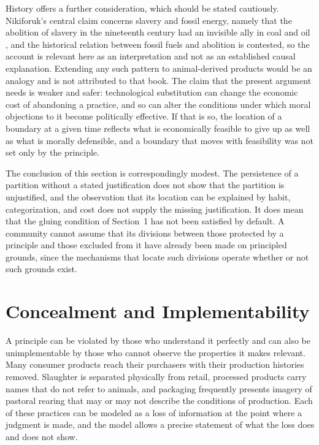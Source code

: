 \documentclass[11pt]{article}
\theoremstyle{definition}
\theoremstyle{plain}
\theoremstyle{definition}
\begin{document}
History offers a further consideration, which should be stated cautiously. Nikiforuk's central claim concerns slavery and fossil energy, namely that the abolition of slavery in the nineteenth century had an invisible ally in coal and oil \cite{nikiforuk2012}, and the historical relation between fossil fuels and abolition is contested, so the account is relevant here as an interpretation and not as an established causal explanation. Extending any such pattern to animal-derived products would be an analogy and is not attributed to that book. The claim that the present argument needs is weaker and safer: technological substitution can change the economic cost of abandoning a practice, and so can alter the conditions under which moral objections to it become politically effective. If that is so, the location of a boundary at a given time reflects what is economically feasible to give up as well as what is morally defensible, and a boundary that moves with feasibility was not set only by the principle.

The conclusion of this section is correspondingly modest. The persistence of a partition without a stated justification does not show that the partition is unjustified, and the observation that its location can be explained by habit, categorization, and cost does not supply the missing justification. It does mean that the gluing condition of Section~1 has not been satisfied by default. A community cannot assume that its divisions between those protected by a principle and those excluded from it have already been made on principled grounds, since the mechanisms that locate such divisions operate whether or not such grounds exist.

\section{Concealment and Implementability}

A principle can be violated by those who understand it perfectly and can also be unimplementable by those who cannot observe the properties it makes relevant. Many consumer products reach their purchasers with their production histories removed. Slaughter is separated physically from retail, processed products carry names that do not refer to animals, and packaging frequently presents imagery of pastoral rearing that may or may not describe the conditions of production. Each of these practices can be modeled as a loss of information at the point where a judgment is made, and the model allows a precise statement of what the loss does and does not show.
\end{document}
